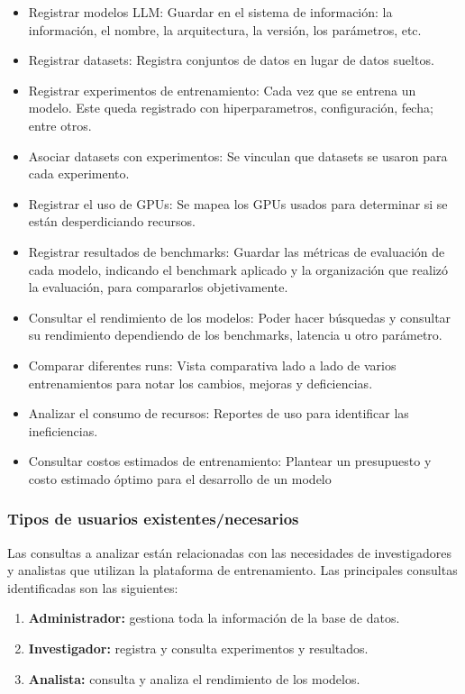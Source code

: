 \documentclass[12pt,a4paper]{article}
\begin{document}
{\begin{itemize}
  \item Registrar modelos LLM: Guardar en el sistema de información: la información, el nombre, la arquitectura, la versión, los parámetros, etc.
  \item Registrar datasets: Registra conjuntos de datos en lugar de datos sueltos.
  \item Registrar experimentos de entrenamiento: Cada vez que se entrena un modelo. Este queda registrado con hiperparametros, configuración, fecha; entre otros.
  \item Asociar datasets con experimentos: Se vinculan que datasets se usaron para cada experimento.
  \item Registrar el uso de GPUs: Se mapea los GPUs usados para determinar si se están desperdiciando recursos.
  \item Registrar resultados de benchmarks: Guardar las métricas de evaluación de cada modelo, indicando el benchmark aplicado y la organización que realizó la evaluación, para compararlos objetivamente.
  \item Consultar el rendimiento de los modelos: Poder hacer búsquedas y consultar su rendimiento dependiendo de los benchmarks, latencia u otro parámetro.
  \item Comparar diferentes runs: Vista comparativa lado a lado de varios entrenamientos para notar los cambios, mejoras y deficiencias.
  \item Analizar el consumo de recursos: Reportes de uso para identificar las ineficiencias.
  \item Consultar costos estimados de entrenamiento: Plantear un presupuesto y costo estimado óptimo para el desarrollo de un modelo
\end{itemize}
}

\subsubsection{Tipos de usuarios existentes/necesarios}

\noindent Las consultas a analizar están relacionadas con las necesidades de investigadores y analistas que utilizan la plataforma de entrenamiento. Las principales consultas identificadas son las siguientes:
{\begin{enumerate}
  \item \textbf{Administrador:} gestiona toda la información de la base de datos.
  \item \textbf{Investigador:} registra y consulta experimentos y resultados.
  \item \textbf{Analista:} consulta y analiza el rendimiento de los modelos.
\end{enumerate}
}
\end{document}
